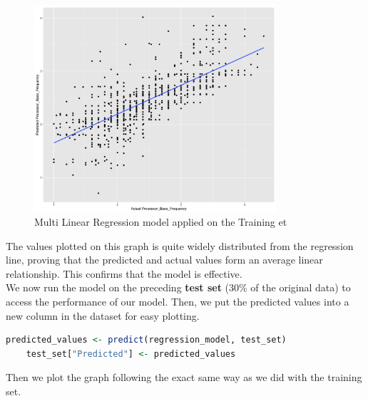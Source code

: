 \begin{figure}[H]
    \centering
    \includegraphics[width=0.8\textwidth]{graphics/train_test_graph.png}
    \caption{Multi Linear Regression model applied on the Training et}
    \label{fig:train_test_graph}
\end{figure}

The values plotted on this graph is quite widely distributed from the regression line, proving that the predicted and actual values form an average linear relationship. This confirms that the model is effective.\\

We now run the model on the preceding \textbf{test set} (30\% of the original data) to access the performance of our model. Then, we put the predicted values into a new column in the dataset for easy plotting.\\

\begin{lstlisting}[language=R]
    predicted_values <- predict(regression_model, test_set)
    test_set["Predicted"] <- predicted_values
\end{lstlisting}

Then we plot the graph following the exact same way as we did with the training set.\\

